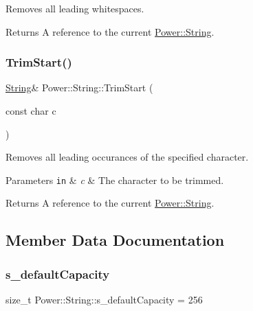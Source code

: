 Removes all leading whitespaces. 

\begin{DoxyReturn}{Returns}
A reference to the current \hyperlink{class_power_1_1_string}{Power\+::\+String}. 
\end{DoxyReturn}
\mbox{\label{class_power_1_1_string_a1c0bda3a9e8ac38157413bcce1600d14}} 
\subsubsection{\texorpdfstring{Trim\+Start()}{TrimStart()}\hspace{0.1cm}{\footnotesize\ttfamily [2/2]}}
{\footnotesize\ttfamily \hyperlink{class_power_1_1_string}{String}\& Power\+::\+String\+::\+Trim\+Start (\begin{DoxyParamCaption}\item[{const char}]{c }\end{DoxyParamCaption})\hspace{0.3cm}{\ttfamily [inline]}}



Removes all leading occurances of the specified character. 


\begin{DoxyParams}[1]{Parameters}
\mbox{\tt in}  & {\em c} & The character to be trimmed. \\
\hline
\end{DoxyParams}
\begin{DoxyReturn}{Returns}
A reference to the current \hyperlink{class_power_1_1_string}{Power\+::\+String}. 
\end{DoxyReturn}


\subsection{Member Data Documentation}
\mbox{\label{class_power_1_1_string_a9ffb47096926f8bf69666dae8cd4e92e}} 
\subsubsection{\texorpdfstring{s\+\_\+default\+Capacity}{s\_defaultCapacity}}
{\footnotesize\ttfamily size\+\_\+t Power\+::\+String\+::s\+\_\+default\+Capacity = 256\hspace{0.3cm}{\ttfamily [static]}}




